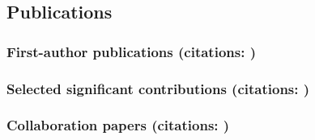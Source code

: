 \documentclass[letterpaper,12pt,preprint]{article}
\def\withfull{}
\begin{document}

\subsection{Publications}


\subsubsection{First-author publications (citations: \firstcites)}
\begin{list}{}{\cvlist}
  \ifdefined\withfull
    
  \else
    
  \fi
\end{list}

\subsubsection{Selected significant contributions (citations: \sigcites)}
\begin{list}{}{\cvlist}
  \ifdefined\withfull
    
  \else
    
  \fi
\end{list}

\subsubsection{Collaboration papers (citations: \collabcites)}
\begin{list}{}{\cvlist}
  
\end{list}
\end{document}
